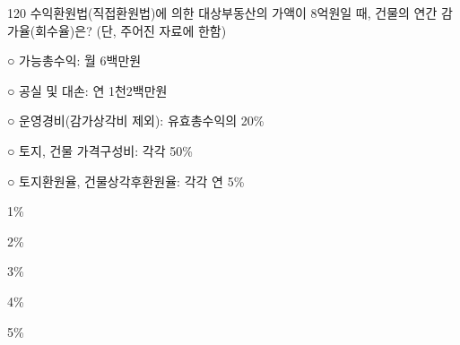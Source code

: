 \begin{question}{120}
수익환원법(직접환원법)에 의한 대상부동산의 가액이 8억원일 때, 건물의 연간 감가율(회수율)은? (단, 주어진 자료에 한함)
\begin{framedtext}
○ 가능총수익: 월 6백만원 \par
○ 공실 및 대손: 연 1천2백만원 \par
○ 운영경비(감가상각비 제외): 유효총수익의 20\% \par
○ 토지, 건물 가격구성비: 각각 50\% \par
○ 토지환원율, 건물상각후환원율: 각각 연 5\%
\end{framedtext}
\begin{choices}
  \item 1\%
  \item 2\%
  \item 3\%
  \item 4\%
  \item 5\%
\end{choices}
\end{question}
